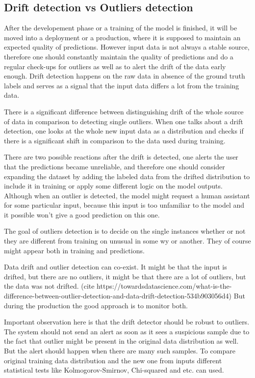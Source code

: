 \subsection{Drift detection vs Outliers detection}

After the developement phase or a training of the model is finished, it will be moved into a deployment or a production, where it is supposed to maintain an expected quality of predictions. However input data is not always a stable source, therefore one should constantly maintain the quality of predictions and do a regular check-ups for outliers as well as to alert the drift of the data early enough. Drift detection happens on the raw data in absence of the ground truth labels and serves as a signal that the input data differs a lot from the training data.

There is a significant difference between distinguishing drift of the whole source of data in comparison to detecting single outliers. When one talks about a drift detection, one looks at the whole new input data as a distribution and checks if there is a significant shift in comparison to the data used during training.

There are two possible reactions after the drift is detected, one alerts the user that the predictions became unreliable, and therefore one should consider expanding the dataset by adding the labeled data from the drifted distribution to include it in training or apply some different logic on the model outputs. Although when an outlier is detected, the model might request a human assistant for some particular input, because this input is too unfamiliar to the model and it possible won't give a good prediction on this one.

The goal of outliers detection is to decide on the single instances whether or not they are different from training on unusual in some wy or another. They of course might appear both in training and predictions.

Data drift and outlier detection can co-exist. It might be that the input is drifted, but there are no outliers, it might be that there are a lot of outliers, but the data was not drifted. (cite https://towardsdatascience.com/what-is-the-difference-between-outlier-detection-and-data-drift-detection-534b903056d4) But during the production the good approach is to monitor both.

Important observation here is that the drift detector should be robust to outliers. The system should not send an alert as soon as it sees a suspicious sample due to the fact that outlier might be present in the original data distribution as well. But the alert should happen when there are many such samples. To compare original training data distribution and the new one from inputs different statistical tests like Kolmogorov-Smirnov, Chi-squared and etc. can used.

